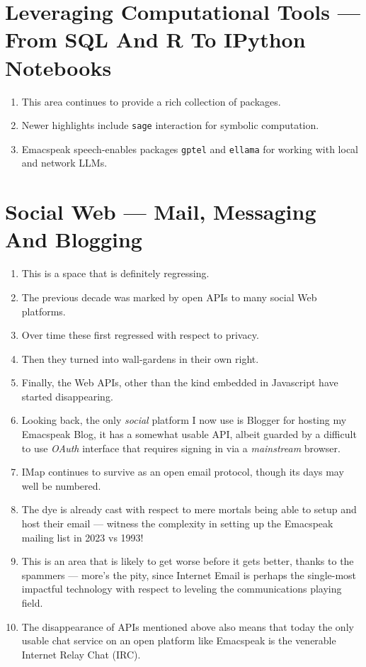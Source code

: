 \documentclass[11pt]{article}
\begin{document}
\section{Leveraging Computational Tools —  From SQL And R To IPython Notebooks}
\label{sec:orgefc2418}

\begin{enumerate}
\item This area continues to provide a rich collection of  packages.
\item Newer highlights include \texttt{sage} interaction for symbolic computation.
\item Emacspeak speech-enables  packages  \texttt{gptel} and \texttt{ellama} for working
with local and network LLMs.
\end{enumerate}
\section{Social Web  — Mail, Messaging And Blogging}
\label{sec:orgdb9f351}

\begin{enumerate}
\item This is a space that is definitely regressing.
\item The previous decade was marked by open APIs to many social Web platforms.
\item Over time these first regressed with respect to privacy.
\item Then they turned into wall-gardens in their own right.
\item Finally, the Web APIs, other than the kind embedded in Javascript have
started disappearing.
\item Looking back, the only \emph{social} platform I now use is Blogger for
hosting my Emacspeak Blog, it has a somewhat usable API, albeit
guarded by a difficult to use \emph{OAuth} interface that requires 
signing   in via  a \emph{mainstream} browser.
\item IMap continues to survive as an open email protocol, though its
days may well be numbered.
\item The dye is already cast with respect to mere mortals being able
to setup and  host their email ---  witness the complexity in setting
up the Emacspeak mailing list in 2023 vs 1993!
\item This is an area that is  likely to get worse before it gets
better,  thanks to the spammers  --- more's  the pity, since Internet Email is perhaps the
single-most impactful technology with respect to leveling the
communications playing field.
\item The disappearance of APIs mentioned above also means that today
the only usable chat service on an open platform like Emacspeak
is the venerable  Internet Relay Chat (IRC).
\end{enumerate}
\end{document}

